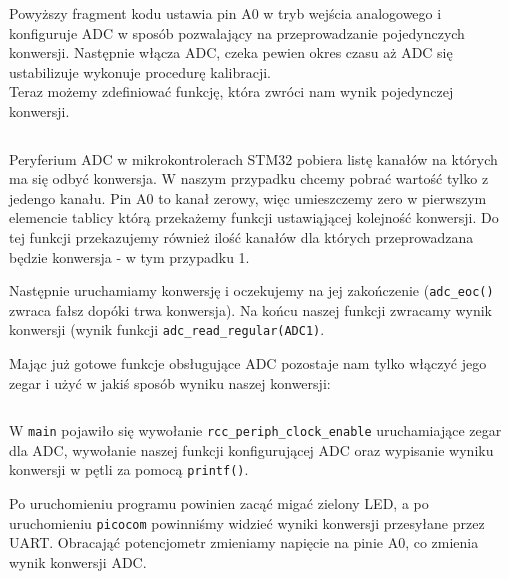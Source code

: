 Powyższy fragment kodu ustawia pin A0 w tryb wejścia analogowego i konfiguruje ADC w sposób pozwalający na przeprowadzanie pojedynczych konwersji. Następnie włącza ADC, czeka pewien okres czasu aż ADC się ustabilizuje wykonuje procedurę kalibracji.\\

Teraz możemy zdefiniować funkcję, która zwróci nam wynik pojedynczej konwersji.

\inputminted[frame=single,firstline=36,lastline=48]{c}{stm32-examples/30_adc/main.c} %

Peryferium ADC w mikrokontrolerach STM32 pobiera listę kanałów na których ma się odbyć konwersja. W naszym przypadku chcemy pobrać
wartość tylko z jedengo kanału. Pin A0 to kanał zerowy, więc umieszczemy zero w pierwszym elemencie tablicy którą przekażemy
funkcji ustawiąjącej kolejność konwersji. Do tej funkcji przekazujemy również ilość kanałów dla których przeprowadzana będzie
konwersja - w tym przypadku 1.

Następnie uruchamiamy konwersję i oczekujemy na jej zakończenie (\Verb$adc_eoc()$ zwraca fałsz dopóki trwa konwersja).
Na końcu naszej funkcji zwracamy wynik konwersji (wynik funkcji \Verb$adc_read_regular(ADC1)$.

Mając już gotowe funkcje obsługujące ADC pozostaje nam tylko włączyć jego zegar i użyć w jakiś sposób wyniku naszej konwersji:

\inputminted[frame=single,firstline=49]{c}{stm32-examples/30_adc/main.c} %

W \Verb$main$ pojawiło się wywołanie \Verb$rcc_periph_clock_enable$ uruchamiające zegar dla ADC, wywołanie naszej funkcji
konfigurującej ADC oraz wypisanie wyniku konwersji w pętli za pomocą \Verb$printf()$.

Po uruchomieniu programu powinien zacąć migać zielony LED, a po uruchomieniu \Verb$picocom$ powinniśmy widzieć wyniki konwersji
przesyłane przez UART. Obracająć potencjometr zmieniamy napięcie na pinie A0, co zmienia wynik konwersji ADC.

